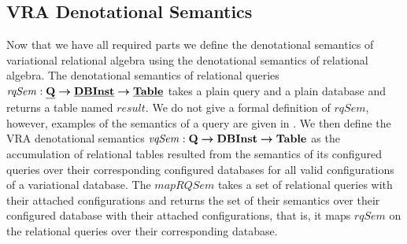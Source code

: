 \subsection{VRA Denotational Semantics }
\label{sec:vradensem}

Now that we have all required parts we define the denotational semantics of 
variational relational algebra using the denotational semantics of relational 
algebra. The denotational semantics of relational queries 
$\mathit{rqSem} : \pQSet \totype \pInstSet \totype \pTabSet$ takes a plain query and
a plain database and returns a table named $\mathit{result}$. We do not give a formal 
definition of $\mathit{rqSem}$, however, examples of the semantics
of a query are given in .
%
We then define the VRA denotational semantics 
$\mathit{vqSem} : \qSet \totype \vdbInstSet \totype \tabletype$ as the 
accumulation of relational tables resulted from the semantics of its
configured queries over their corresponding configured databases for all 
valid configurations of a variational database. 
%
The $\mathit{mapRQSem}$ takes a set of relational queries with their attached
configurations and returns the set of their semantics over their configured database
with their attached configurations, that is, it maps $\mathit{rqSem}$ on the 
relational queries over their corresponding database. 




\begin{example}
\label{eg:sem}
\end{example}